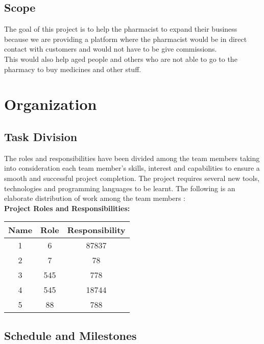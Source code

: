\documentclass[
10pt, %
a4paper, %
oneside, %
headinclude,footinclude, %
BCOR5mm, %
]{scrartcl}
\begin{document}

\subsection{Scope}
The goal of this project is to help the pharmacist to expand their business because we are providing a platform where the pharmacist would be in direct contact with customers and would not have to be give commissions.\\
This would also help aged people and others who are not able to go to the pharmacy to buy medicines and other stuff.

\section{ Organization}
\subsection{Task Division}


The roles and responsibilities have been divided among the team members taking into consideration each team member’s skills, interest and capabilities to ensure a smooth and successful project completion. The project requires several new tools, technologies and programming languages to be learnt. The following is an elaborate distribution of work among the team members :
\vspace{2cm}
\\\textbf{Project Roles and Responsibilities:}
\begin{center}
 \begin{tabular}{||c| c| c||} 
 \hline
 Name & Role & Responsibility  \\ [1.5ex] 
 \hline\hline
 1 & 6 & 87837   \\ 
 \hline
 2 & 7 & 78  \\
 \hline
 3 & 545 & 778 \\
 \hline
 4 & 545 & 18744 \\
 \hline
 5 & 88 & 788 \\ [1ex] 
 \hline
\end{tabular}
\end{center}

\subsection{ Schedule and Milestones}
\end{document}
